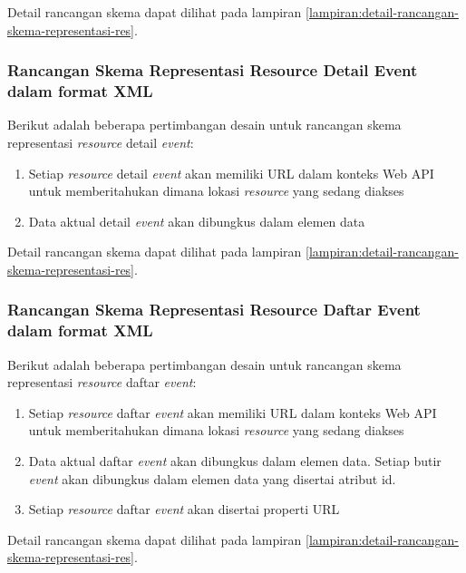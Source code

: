 \documentclass[a4paper, 12pt, oneside]{report}
\begin{document}
Detail rancangan skema dapat dilihat pada lampiran \ref{lampiran:detail-rancangan-skema-representasi-res}.

\subsubsection{Rancangan Skema Representasi Resource Detail Event dalam format XML}

\onehalfspacing Berikut adalah beberapa pertimbangan desain untuk rancangan skema representasi \textit{resource} detail \textit{event}:

\begin{enumerate}
  \item Setiap \textit{resource} detail \textit{event} akan memiliki URL dalam konteks Web API untuk memberitahukan dimana lokasi \textit{resource} yang sedang diakses
  \item Data aktual detail \textit{event} akan dibungkus dalam elemen data
\end{enumerate}

Detail rancangan skema dapat dilihat pada lampiran \ref{lampiran:detail-rancangan-skema-representasi-res}.

\subsubsection{Rancangan Skema Representasi Resource Daftar Event dalam format XML}

\onehalfspacing Berikut adalah beberapa pertimbangan desain untuk rancangan skema representasi \textit{resource} daftar \textit{event}:

\begin{enumerate}
  \item Setiap \textit{resource} daftar \textit{event} akan memiliki URL dalam konteks Web API untuk memberitahukan dimana lokasi \textit{resource} yang sedang diakses
  \item Data aktual daftar \textit{event} akan dibungkus dalam elemen data. Setiap butir \textit{event} akan dibungkus dalam elemen data yang disertai atribut id.
\item Setiap \textit{resource} daftar \textit{event} akan disertai properti URL
\end{enumerate}

Detail rancangan skema dapat dilihat pada lampiran \ref{lampiran:detail-rancangan-skema-representasi-res}.
\end{document}

